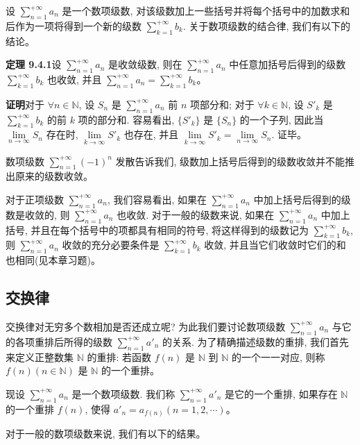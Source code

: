 \documentclass[UTF8,12pt,a4paper,fontset=fandol]{ctexart}
\begin{document}
设 $\sum\limits_{n=1}^{+\infty}a_n$ 是一个数项级数, 对该级数加上一些括号并将每个括号中的加数求和后作为一项将得到一个新的级数 $\sum\limits_{k=1}^{+\infty}b_k$. 关于数项级数的结合律, 我们有以下的结论。

\noindent\textbf{定理 9.4.1}\quad 设 $\sum\limits_{n=1}^{+\infty}a_n$ 是收敛级数, 则在 $\sum\limits_{n=1}^{+\infty}a_n$ 中任意加括号后得到的级数 $\sum\limits_{k=1}^{+\infty}b_k$ 也收敛, 并且 $\sum\limits_{n=1}^{+\infty}a_n=\sum\limits_{k=1}^{+\infty}b_k$。

\noindent\textbf{证明}\quad 对于 $\forall n\in\mathbb{N}$, 设 $S_n$ 是 $\sum\limits_{n=1}^{+\infty}a_n$ 前 $n$ 项部分和; 对于 $\forall k\in\mathbb{N}$, 设 $S'_k$ 是 $\sum\limits_{k=1}^{+\infty}b_k$ 的前 $k$ 项的部分和. 容易看出, $\{S'_k\}$ 是 $\{S_n\}$ 的一个子列, 因此当 $\lim\limits_{n\to\infty}S_n$ 存在时, $\lim\limits_{k\to\infty}S'_k$ 也存在, 并且 $\lim\limits_{k\to\infty}S'_k=\lim\limits_{n\to\infty}S_n$. 证毕。

数项级数 $\sum\limits_{n=1}^{+\infty}(-1)^n$ 发散告诉我们, 级数加上括号后得到的级数收敛并不能推出原来的级数收敛。

对于正项级数 $\sum\limits_{n=1}^{+\infty}a_n$, 我们容易看出, 如果在 $\sum\limits_{n=1}^{+\infty}a_n$ 中加上括号后得到的级数是收敛的, 则 $\sum\limits_{n=1}^{+\infty}a_n$ 也收敛. 对于一般的级数来说, 如果在 $\sum\limits_{n=1}^{+\infty}a_n$ 中加上括号, 并且在每个括号中的项都具有相同的符号, 将这样得到的级数记为 $\sum\limits_{k=1}^{+\infty}b_k$, 则 $\sum\limits_{n=1}^{+\infty}a_n$ 收敛的充分必要条件是 $\sum\limits_{k=1}^{+\infty}b_k$ 收敛, 并且当它们收敛时它们的和也相同(见本章习题)。

\subsection{交换律}

交换律对无穷多个数相加是否还成立呢? 为此我们要讨论数项级数 $\sum\limits_{n=1}^{+\infty}a_n$ 与它的各项重排后所得的级数 $\sum\limits_{n=1}^{+\infty}a'_n$ 的关系. 为了精确描述级数的重排, 我们首先来定义正整数集 $\mathbb{N}$ 的重排: 若函数 $f(n)$ 是 $\mathbb{N}$ 到 $\mathbb{N}$ 的一个一一对应, 则称 $f(n)(n\in\mathbb{N})$ 是 $\mathbb{N}$ 的一个重排。

现设 $\sum\limits_{n=1}^{+\infty}a_n$ 是一个数项级数. 我们称 $\sum\limits_{n=1}^{+\infty}a'_n$ 是它的一个重排, 如果存在 $\mathbb{N}$ 的一个重排 $f(n)$, 使得 $a'_n=a_{f(n)}(n=1,2,\cdots)$。

对于一般的数项级数来说, 我们有以下的结果。
\end{document}
